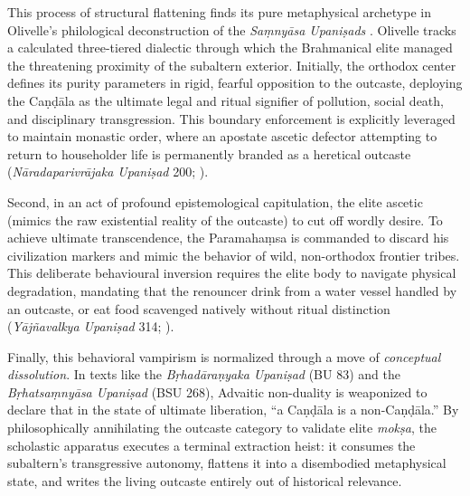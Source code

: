 \documentclass[11pt,twoside,letterpaper]{article}
\begin{document}
This process of structural flattening finds its pure metaphysical archetype in Olivelle's philological deconstruction of the \textit{Saṃnyāsa Upaniṣads} \cite{olivelle1992}. Olivelle tracks a calculated three-tiered dialectic through which the Brahmanical elite managed the threatening proximity of the subaltern exterior. Initially, the orthodox center defines its purity parameters in rigid, fearful opposition to the outcaste, deploying the Caṇḍāla as the ultimate legal and ritual signifier of pollution, social death, and disciplinary transgression. This boundary enforcement is explicitly leveraged to maintain monastic order, where an apostate ascetic defector attempting to return to householder life is permanently branded as a heretical outcaste (\textit{Nāradaparivrājaka Upaniṣad} 200; \cite{olivelle1992}).

Second, in an act of profound epistemological capitulation, the elite ascetic (mimics the raw existential reality of the outcaste) to cut off wordly desire. To achieve ultimate transcendence, the Paramahaṃsa is commanded to discard his civilization markers and mimic the behavior of wild, non-orthodox frontier tribes. This deliberate behavioural inversion requires the elite body to navigate physical degradation, mandating that the renouncer drink from a water vessel handled by an outcaste, or eat food scavenged natively without ritual distinction (\textit{Yājñavalkya Upaniṣad} 314; \cite{olivelle1992}).

Finally, this behavioral vampirism is normalized through a move of \textit{conceptual dissolution}. In texts like the \textit{Bṛhadāraṇyaka Upaniṣad} (BU 83) and the \textit{Bṛhatsaṃnyāsa Upaniṣad} (BSU 268), Advaitic non-duality is weaponized to declare that in the state of ultimate liberation, ``a Caṇḍāla is a non-Caṇḍāla.'' By philosophically annihilating the outcaste category to validate elite \textit{mokṣa}, the scholastic apparatus executes a terminal extraction heist: it consumes the subaltern's transgressive autonomy, flattens it into a disembodied metaphysical state, and writes the living outcaste entirely out of historical relevance.
\end{document}
